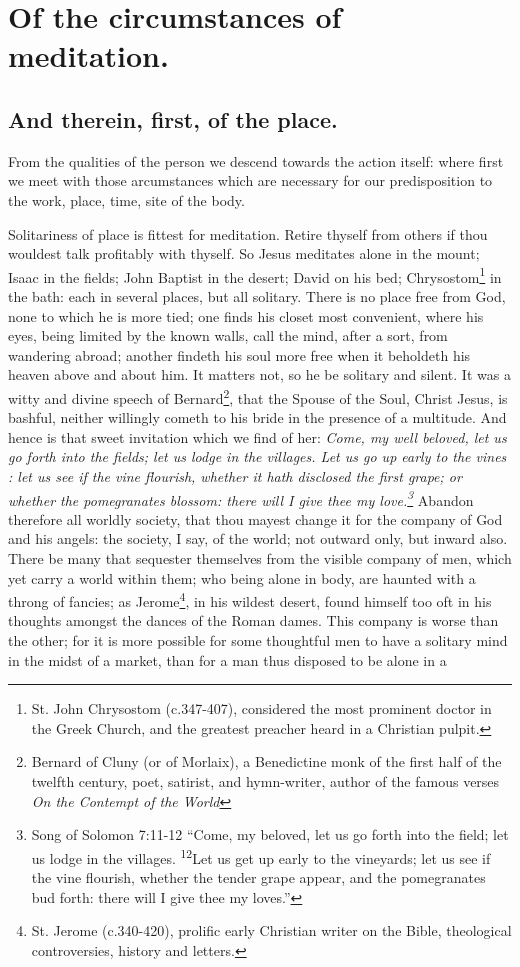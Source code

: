\chapter{Of the circumstances of meditation.}
\section{And therein, first, of the place.}

From the qualities of the person we descend towards the action itself: where first we meet with those arcumstances which are necessary for our predisposition to the work, place, time, site of the body. 

Solitariness of place is fittest for meditation. Retire thyself from others if thou wouldest talk profitably with thyself. So Jesus meditates alone in the mount; Isaac in the fields; John Baptist in the desert; David on his bed; Chrysostom\footnote{St. John Chrysostom (c.347-407), considered the most prominent doctor in the Greek Church, and the greatest preacher heard in a Christian pulpit.\cite{cath1913}} in the bath: each in several places, but all solitary. There is no place free from God, none to which he is more tied; one finds his closet most convenient, where his eyes, being limited by the known walls, call the mind, after a sort, from wandering abroad; another findeth his soul more free when it beholdeth his heaven above and about him. It matters not, so he be solitary and silent. It was a witty and divine speech of Bernard\footnote{Bernard of Cluny (or of Morlaix), a Benedictine monk of the first half of the twelfth century, poet, satirist, and hymn-writer, author of the famous verses \emph{On the Contempt of the World}\cite{cath1913}}, that the Spouse of the Soul, Christ Jesus, is bashful, neither willingly cometh to his bride in the presence of a multitude. And hence is that sweet invitation which we find of her: \emph{Come, my well beloved, let us go forth into the fields; let us lodge in the villages. Let us go up early to the vines : let us see if the vine flourish, whether it hath disclosed the first grape; or whether the pomegranates blossom: there will I give thee my love.\footnote{Song of Solomon 7:11-12 ``Come, my beloved, let us go forth into the field; let us lodge in the villages. \textsuperscript{12}Let us get up early to the vineyards; let us see if the vine flourish, whether the tender grape appear, and the pomegranates bud forth: there will I give thee my loves.''}} Abandon therefore all worldly society, that thou mayest change it for the company of God and his angels: the society, I say, of the world; not outward only, but inward also. There be many that sequester themselves from the visible company of men, which yet carry a world within them; who being alone in body, are haunted with a throng of fancies; as Jerome\footnote{St. Jerome (c.340-420), prolific early Christian writer on the Bible, theological controversies, history and letters\cite{cath1913}.}, in his wildest desert, found himself too oft in his thoughts amongst the dances of the Roman dames. This company is worse than the other; for it is more possible for some thoughtful men to have a solitary mind in the midst of a market, than for a man thus disposed to be alone in a 